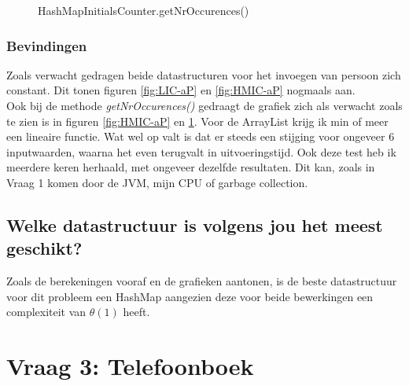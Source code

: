 \documentclass[10pt,a4paper]{report}
\begin{document}
\begin{figure}[h!]
    \centering
    \caption{HashMapInitialsCounter.getNrOccurences()}
    \label{fig:HMIC-gNO}
\end{figure}
\newpage
\subsubsection*{Bevindingen}
Zoals verwacht gedragen beide datastructuren voor het invoegen van persoon zich constant. Dit tonen figuren \ref{fig:LIC-aP} en \ref{fig:HMIC-aP} nogmaals aan.\\
Ook bij de methode \textsl{getNrOccurences()} gedraagt de grafiek zich als verwacht zoals te zien is in figuren \ref{fig:HMIC-aP} en \ref{fig:HMIC-gNO}. Voor de ArrayList krijg ik min of meer een lineaire functie. Wat wel op valt is dat er steeds een stijging voor ongeveer 6 inputwaarden, waarna het even terugvalt in uitvoeringstijd. Ook deze test heb ik meerdere keren herhaald, met ongeveer dezelfde resultaten. Dit kan, zoals in Vraag 1 komen door de JVM, mijn CPU of garbage collection.

\subsection*{Welke datastructuur is volgens jou het meest geschikt?}
Zoals de berekeningen vooraf en de grafieken aantonen, is de beste datastructuur voor dit probleem een HashMap aangezien deze voor beide bewerkingen een complexiteit van $\theta(1)$ heeft.


\section*{Vraag 3: Telefoonboek}
\end{document}
